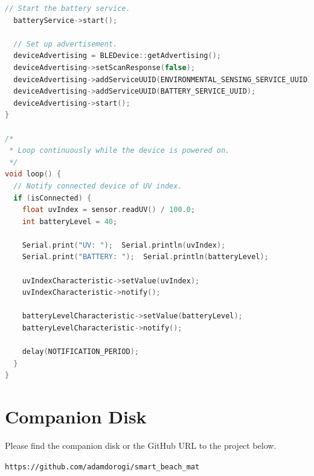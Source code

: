 \documentclass[12pt,openany,a4paper]{book}
\begin{document}
\begin{lstlisting}[basicstyle=\ttfamily,breaklines=true,language=c++]
  // Start the battery service.
  batteryService->start();

  // Set up advertisement.
  deviceAdvertising = BLEDevice::getAdvertising();
  deviceAdvertising->setScanResponse(false);
  deviceAdvertising->addServiceUUID(ENVIRONMENTAL_SENSING_SERVICE_UUID);
  deviceAdvertising->addServiceUUID(BATTERY_SERVICE_UUID);
  deviceAdvertising->start();
}

/*
 * Loop continuously while the device is powered on.
 */
void loop() {
  // Notify connected device of UV index.
  if (isConnected) {
    float uvIndex = sensor.readUV() / 100.0;
    int batteryLevel = 40;

    Serial.print("UV: ");  Serial.println(uvIndex);
    Serial.print("BATTERY: ");  Serial.println(batteryLevel);
    
    uvIndexCharacteristic->setValue(uvIndex);
    uvIndexCharacteristic->notify();

    batteryLevelCharacteristic->setValue(batteryLevel);
    batteryLevelCharacteristic->notify();
    
    delay(NOTIFICATION_PERIOD);
  }
}
\end{lstlisting}

\chapter{Companion Disk}

Please find the companion disk or the GitHub URL to the project below.

\verb|https://github.com/adamdorogi/smart_beach_mat|

\cleardoublepage




\end{document}
